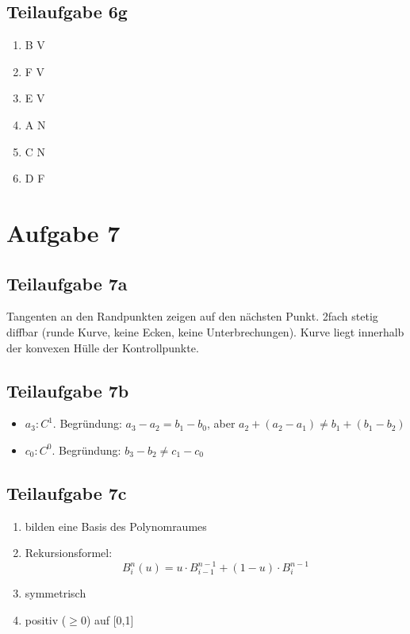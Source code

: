 \documentclass[a4paper]{scrartcl}
\begin{document}
\subsection*{Teilaufgabe 6g}
\begin{enumerate}
    \item B V
    \item F V
    \item E V
    \item A N
    \item C N
    \item D F
\end{enumerate}

\section*{Aufgabe 7}
\subsection*{Teilaufgabe 7a}


Tangenten an den Randpunkten zeigen auf den nächsten Punkt. 2fach stetig diffbar (runde Kurve, keine Ecken, keine Unterbrechungen). Kurve liegt innerhalb der konvexen Hülle der Kontrollpunkte.

\subsection*{Teilaufgabe 7b}

\begin{itemize}
    \item $a_3: C^1$. Begründung: $a_3 - a_2 = b_1 - b_0$, aber $a_2 + (a_2-a_1) \neq b_1 + (b_1 - b_2)$
    \item $c_0: C^0$. Begründung: $b_3-b_2 \neq c_1 - c_0$
\end{itemize}

\subsection*{Teilaufgabe 7c}
\begin{enumerate}
    \item bilden eine Basis des Polynomraumes
    \item Rekursionsformel: \[B^n_i(u) = u \cdot B^{n-1}_{i-1} + (1-u) \cdot B^{n-1}_{i} \]
    \item symmetrisch
    \item positiv ($\geq 0$) auf [0,1]
\end{enumerate}
\end{document}
